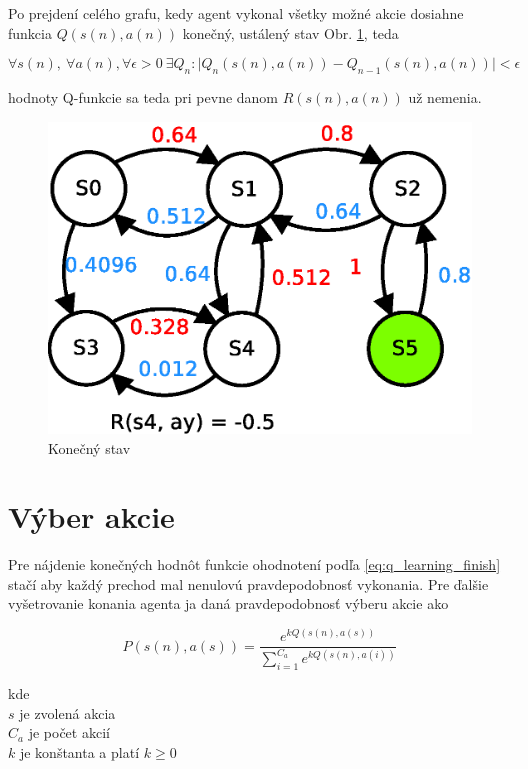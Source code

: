 Po prejdení celého grafu, kedy agent vykonal všetky možné akcie dosiahne
funkcia $Q(s(n), a(n))$ konečný, ustálený stav Obr. \ref{img:q_learning_6}, teda

\begin{equation}
\forall s(n),\ \forall a(n),\forall \epsilon > 0 \  \exists Q_{n} : \mid Q_{n}(s(n), a(n)) - Q_{n-1}(s(n), a(n)) \mid < \epsilon
\label{eq:q_learning_finish}
\end{equation}

hodnoty Q-funkcie sa teda pri pevne danom $R(s(n), a(n))$ už nemenia.


\begin{figure}[!htb]
\center
\includegraphics[scale=.6]{../diagrams/q_learning_table_06.eps}
\caption{Konečný stav}
\label{img:q_learning_6}
\end{figure}


\section{Výber akcie}

Pre nájdenie konečných hodnôt funkcie ohodnotení podľa \ref{eq:q_learning_finish}
stačí aby každý prechod mal nenulovú pravdepodobnosť vykonania. Pre ďalšie vyšetrovanie
konania agenta ja daná pravdepodobnosť výberu akcie  ako

\begin{equation}
P(s(n), a(s)) = \frac{e^{kQ(s(n), a(s))}}{ \sum\limits_{i=1}^{C_a}{e^{kQ(s(n), a(i))}} }
\label{eq:action_selection}
\end{equation}

kde \\
$s$ je zvolená akcia \\
$C_a$ je počet akcií \\
$k$ je konštanta a platí $k \geq 0$

